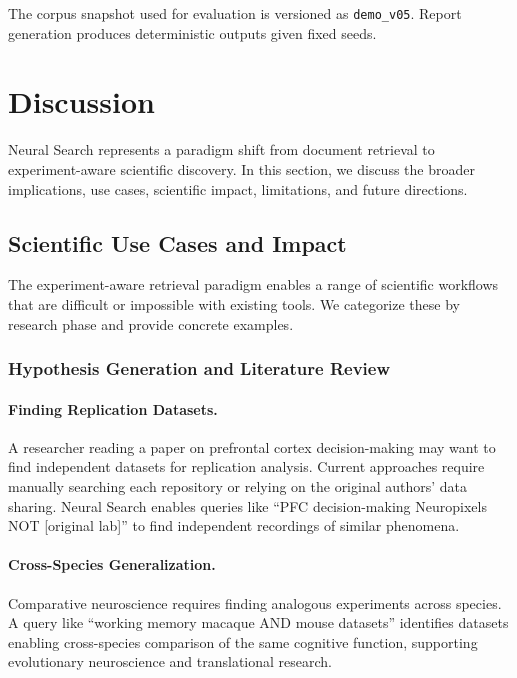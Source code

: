 \documentclass{article}
\theoremstyle{definition}
\begin{document}
The corpus snapshot used for evaluation is versioned as \texttt{demo\_v05}. Report generation produces deterministic outputs given fixed seeds.

\section{Discussion}
\label{sec:discussion}

Neural Search represents a paradigm shift from document retrieval to experiment-aware scientific discovery. In this section, we discuss the broader implications, use cases, scientific impact, limitations, and future directions.

\subsection{Scientific Use Cases and Impact}

The experiment-aware retrieval paradigm enables a range of scientific workflows that are difficult or impossible with existing tools. We categorize these by research phase and provide concrete examples.

\subsubsection{Hypothesis Generation and Literature Review}

\paragraph{Finding Replication Datasets.} A researcher reading a paper on prefrontal cortex decision-making may want to find independent datasets for replication analysis. Current approaches require manually searching each repository or relying on the original authors' data sharing. Neural Search enables queries like ``PFC decision-making Neuropixels NOT [original lab]'' to find independent recordings of similar phenomena.

\paragraph{Cross-Species Generalization.} Comparative neuroscience requires finding analogous experiments across species. A query like ``working memory macaque AND mouse datasets'' identifies datasets enabling cross-species comparison of the same cognitive function, supporting evolutionary neuroscience and translational research.
\end{document}

